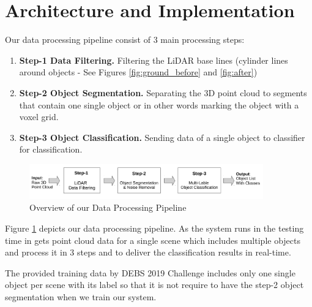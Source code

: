 \section{Architecture and Implementation}\label{sec:Architecture}

Our data processing pipeline consist of 3 main processing steps: 

\begin{enumerate}
  \item \textbf{Step-1 Data Filtering. } Filtering the LiDAR base lines (cylinder lines around objects - See Figures \ref{fig:ground_before} and \ref{fig:after})
  
  \item \textbf{Step-2 Object Segmentation.} Separating the 3D point cloud to segments that contain one single object or in other words marking the object with a voxel grid.
    
  \item \textbf{Step-3 Object Classification.}  Sending data of a single object to classifier for classification.  
\end{enumerate}

\begin{figure}[!hb]
 \begin{center}
   \includegraphics[width=0.9\textwidth]{./images/DataProcessingPipleline.pdf}
   \caption{Overview of our Data Processing Pipeline}
   \label{fig:dataPipeline}
 \end{center}
\end{figure}


Figure \ref{fig:dataPipeline} depicts our data processing pipeline. As the system runs in the testing time in gets point cloud data for a single scene which includes multiple objects and process it in 3 steps and to deliver the classification results in real-time.   

The provided training data by DEBS 2019 Challenge \cite{DEBSGC2019} includes only one single object per scene with its label so that it is not require to have the step-2 object segmentation when we train our system.






